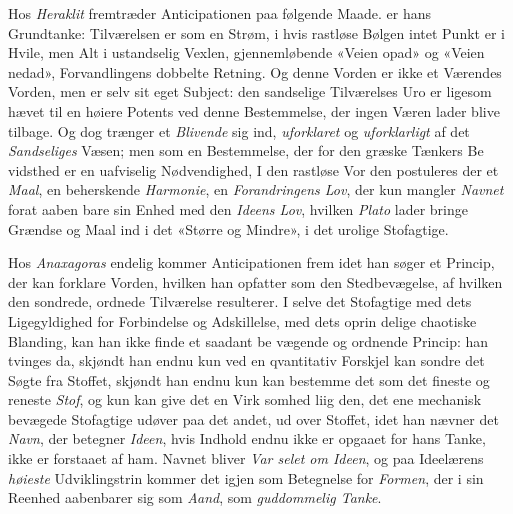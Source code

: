 Hos \emph{Heraklit} fremtræder Anticipationen paa følgende
Maade.  er hans Grundtanke: Tilværelsen er som
en Strøm, i hvis rastløse Bølgen intet Punkt er i Hvile, men
Alt i ustandselig Vexlen, gjennemløbende «Veien opad» og
«Veien nedad», Forvandlingens dobbelte Retning. Og denne
Vorden er ikke et Værendes Vorden, men er selv sit eget
Subject: den sandselige Tilværelses Uro er ligesom hævet til
en høiere Potents ved denne Bestemmelse, der ingen Væren
lader blive tilbage. Og dog trænger et \emph{Blivende} sig ind,
\emph{uforklaret} og \emph{uforklarligt} af det \emph{Sandseliges} Væsen;
men som en Bestemmelse, der for den græske Tænkers Be\-%
vidsthed er en uafviselig Nødvendighed, I den rastløse Vor\-%
den postuleres der et \emph{Maal}, en beherskende \emph{Harmonie}, en
\emph{Forandringens Lov}, der kun mangler \emph{Navnet} forat aaben\-%
bare sin Enhed med den \emph{Ideens Lov}, hvilken \emph{Plato} lader
bringe Grændse og Maal ind i det «Større og Mindre», i det
urolige Stofagtige.

Hos \emph{Anaxagoras} endelig kommer Anticipationen frem
idet han søger et Princip, der kan forklare Vorden, hvilken
han opfatter som den Stedbevægelse, af hvilken den sondrede,
ordnede Tilværelse resulterer. I selve det Stofagtige med dets
Ligegyldighed for Forbindelse og Adskillelse, med dets oprin\-%
delige chaotiske Blanding, kan han ikke finde et saadant be\-%
vægende og ordnende Princip: han tvinges da, skjøndt han
endnu kun ved en qvantitativ Forskjel kan sondre det Søgte
fra Stoffet, skjøndt han endnu kun kan bestemme det som
det fineste og reneste \emph{Stof}, og kun kan give det en Virk\-%
somhed liig den, det ene mechanisk bevægede Stofagtige udøver
paa det andet, ud over Stoffet, idet han nævner det \emph{Navn}, der
betegner \emph{Ideen}, hvis Indhold endnu ikke er opgaaet for hans
Tanke, ikke er forstaaet af ham. Navnet  bliver \emph{Var\-%
selet om Ideen}, og paa Ideelærens \emph{høieste} Udviklingstrin
kommer det igjen som Betegnelse for \emph{Formen}, der i sin
Reenhed aabenbarer sig som \emph{Aand}, som \emph{guddommelig
Tanke}.

